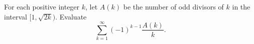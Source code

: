 For each positive integer $k$, let $A(k)$ be the number of odd divisors of $k$ in the interval $[1, \sqrt{2k})$. Evaluate
\[
\sum_{k=1}^\infty (-1)^{k-1} \frac{A(k)}{k}.
\]
